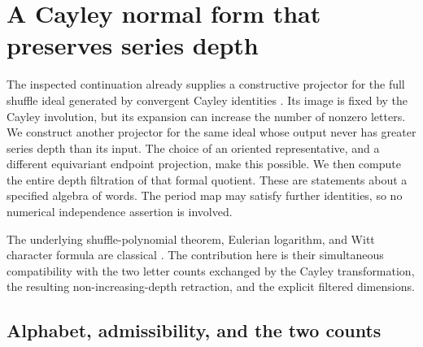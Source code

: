 \providecommand{\shuffle}{\mathbin{\sqcup\!\sqcup}}
\section{A Cayley normal form that preserves series depth}
\label{depthcay:sec}

The inspected continuation already supplies a constructive projector for
 the full shuffle ideal generated by convergent Cayley identities
\cite{depth:PriorProjection}. Its image is fixed by the Cayley involution,
but its expansion can increase the number of nonzero letters. We construct
another projector for the same ideal whose output never has greater
series depth than its input. The choice of an oriented representative,
and a different equivariant endpoint projection, make this possible.
We then compute the entire depth filtration of that formal quotient.
These are statements about a specified algebra of words. The period map
may satisfy further identities, so no numerical independence assertion is
involved.

The underlying shuffle-polynomial theorem, Eulerian logarithm, and Witt
character formula are classical \cite{depth:Radford,depth:Patras,depth:Reutenauer}.
The contribution here is their simultaneous compatibility with the two
letter counts exchanged by the Cayley transformation, the resulting
non-increasing-depth retraction, and the explicit filtered dimensions.

\subsection{Alphabet, admissibility, and the two counts}

